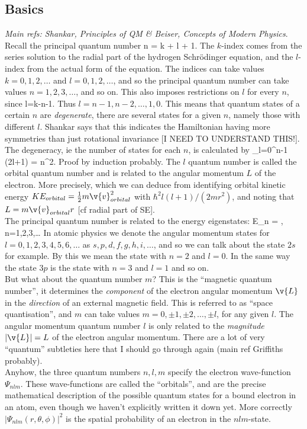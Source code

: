 
\subsection{Basics}
\emph{Main refs: Shankar, Principles of QM \& Beiser, Concepts of Modern Physics}.\\
Recall the principal quantum number
    {
      n = k + l + 1.
    }
    The $k$-index comes from the series solution to the radial part of the hydrogen Schrödinger equation, and the $l$-index from the actual form of the equation. The indices can take values $k=0,1,2,\dots$ and $l=0,1,2,\dots$, and so the principal quantum number can take values $n=1,2,3,\dots$, and so on. This also imposes restrictions on $l$ for every $n$, since
    {
      l=k-n-1.
    }
    Thus $l = n-1,n-2,\dots,1,0$. This means that quantum states of a certain $n$ are \emph{degenerate}, there are several states for a given $n$, namely those with different $l$. Shankar says that this indicates the Hamiltonian having more symmetries than just rotational invariance [I NEED TO UNDERSTAND THIS!]. The degeneracy, ie the number of states for each $n$, is calculated by
    {
      \sum_{l=0}^{n-1} (2l+1) = n^2.
    }
    Proof by induction probably. The $l$ quantum number is called the orbital quantum number and is related to the angular momentum $L$ of the electron. More precisely,
    which we can deduce from identifying orbital kinetic energy $KE_{orbital} = \frac{1}{2}m\v{v}_{orbital}^2$ with $\hbar^2l(l+1)/(2mr^2)$, and noting that $L = m\v{v}_{orbital}r$ [cf radial part of SE].\\
\indent The principal quantum number is related to the energy eigenstates:
    {
      E_n = , \hspace{5pt} n=1,2,3,\dots
      }
    In atomic physics we denote the angular momentum states for $l=0,1,2,3,4,5,6,\dots$ as $s,p,d,f,g,h,i,\dots$, and so we can talk about the state $2s$ for example. By this we mean the state with $n=2$ and $l=0$. In the same way the state $3p$ is the state with $n=3$ and $l=1$ and so on.\\
    \indent But what about the quantum number $m$? This is the ``magnetic quantum number'', it determines the \emph{component} of the electron angular momentum $\v{L}$ in the \emph{direction} of an external magnetic field. This is referred to as ``space quantisation'', and $m$ can take values $m=0,\pm 1,\pm 2,\dots,\pm l$, for any given $l$. The angular momentum quantum number $l$ is only related to the \emph{magnitude} $|\v{L}| = L$ of the electron angular momentum. There are a lot of very ``quantum'' subtleties here that I should go through again (main ref Griffiths probably).\\
    \indent Anyhow, the three quantum numbers $n,l,m$ specify the electron wave-function $\Psi_{nlm}$. These wave-functions are called the ``orbitals'', and are the precise mathematical description of the possible quantum states for a bound electron in an atom, even though we haven't explicitly written it down yet. More correctly $|\Psi_{nlm}(r,\theta,\phi)|^2$ is the spatial probability of an electron in the $nlm$-state. 
